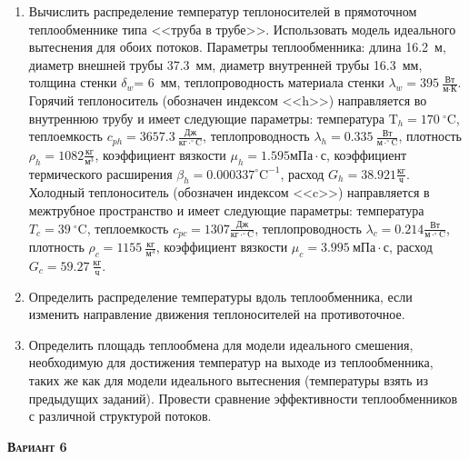 \begin{enumerate} 
\item Вычислить распределение температур теплоносителей в прямоточном теплообменнике типа <<труба в трубе>>. Использовать модель идеального вытеснения для обоих потоков. Параметры теплообменника: длина  16.2~м, диаметр внешней трубы 37.3~мм,  диаметр внутренней трубы 16.3~мм, толщина стенки $\delta_{w}$=     6~мм,  теплопроводность материала стенки $\lambda_{w}=  395~\frac{\text{Вт}}{\text{м} \cdot \text{К}}$.  Горячий теплоноситель (обозначен индексом <<h>>) направляется во внутреннюю трубу и	 имеет следующие параметры: температура $\text{T}_{h}= 170~^\circ\mathrm{C}$, теплоемкость	  $c_{p{h}}= 3657.3~\frac{\text{Дж}}{\text{кг} \cdot ^\circ\mathrm{C}}$, теплопроводность 		$\lambda_{h}= 0.335~\frac{\text{Вт}}{\text{м} \cdot ^\circ\mathrm{C}}$, плотность 		$\rho_{h}= 1082 \frac{\text{кг}}{\text{м}^3}$, коэффициент вязкости $\mu_{h}=1.595 \text{мПа} 		\cdot \text{с} $, коэффициент термического расширения $\beta_{h}=0.000337 ^\circ\mathrm{C}^{-1}$,		 расход $G_{h}= 38.921 \frac{\text{кг}}{\text{ч}}$. Холодный теплоноситель (обозначен индексом <<c>>) 		 направляется в межтрубное пространство и имеет следующие параметры: температура $T_{c}=   39		 ~^\circ\mathrm{C}$, теплоемкость $c_{p{c}}= 1307 \frac{\text{Дж}}{\text{кг} \cdot ^\circ\mathrm{C}}$,			 теплопроводность $\lambda_{c}=0.214 \frac{\text{Вт}}{\text{м} \cdot ^\circ\mathrm{C}}$, плотность 			 $\rho_{c}=  1155~\frac{\text{кг}}{\text{м}^3}$, коэффициент вязкости $\mu_{c}=3.995~\text{мПа} \cdot \text{с} $, 			 расход $G_{c}=59.27~\frac{\text{кг}}{\text{ч}}$. 

\item Определить распределение температуры вдоль теплообменника, если 	изменить направление движения теплоносителей на противоточное.

\item Определить площадь теплообмена для модели идеального смешения, необходимую для достижения 	температур на выходе из теплообменника, таких же как для модели идеального вытеснения (температуры взять из предыдущих заданий).	Провести сравнение эффективности теплообменников с различной структурой потоков.

\end{enumerate}

\textsc{\textbf{Вариант 6}}

